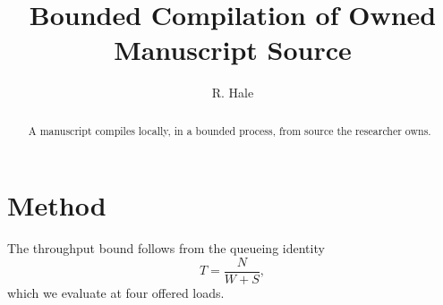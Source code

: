 \documentclass[11pt]{article}
\title{Bounded Compilation of Owned Manuscript Source}
\author{R. Hale}
\begin{document}
\maketitle

\begin{abstract}
A manuscript compiles locally, in a bounded process, from source the researcher owns.
\end{abstract}



\section{Method}
\label{sec:method}

The throughput bound follows from the queueing identity
\begin{equation}
  \label{eq:throughput}
  T = \frac{N}{W + S},
\end{equation}
which we evaluate at four offered loads.



\end{document}
